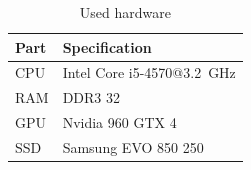 \documentclass[12pt,twoside]{article}
\begin{document}
\begin{table}[h]
	\centering
	\caption{Used hardware}
	\label{tab:hw}
	\begin{tabu}{ll}
		\toprule[2pt]
		Part                               & Specification \\
		\midrule
		CPU                      & Intel Core i5-4570@\SI{3.2}{\giga\hertz}   \\
		RAM                             &   DDR3 \SI{32}{\giga\byte}     \\
		GPU                               & Nvidia 960 GTX \SI{4}{\giga\byte}         \\
		SSD                               & Samsung EVO 850 \SI{250}{\giga\byte}      \\
		\bottomrule[2pt]
	\end{tabu}
\end{table}
\end{document}
